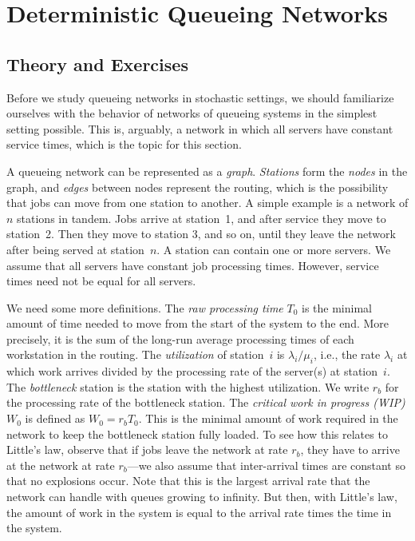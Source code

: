 
\section{Deterministic Queueing Networks}
\label{sec:determ-queu-netw}

\subsection*{Theory and Exercises}


Before we study queueing networks in stochastic settings, we should
familiarize ourselves with the behavior of networks of queueing
systems in the simplest setting possible. This is, arguably, a network in which all servers have constant service times, which is the topic for this section.


A queueing network can be represented as a
\emph{graph}. \emph{Stations} form the \emph{nodes} in the graph, and
\emph{edges} between nodes represent the routing, which is the
possibility that jobs can move from one station to another. A simple
example is a network of $n$ stations in tandem. Jobs arrive at
station~1, and after service they move to station~2. Then they move to
station 3, and so on, until they leave the network after being served at
station~$n$. A station can contain one or more servers. We assume that all servers have constant job processing times. However, service times need not be equal for all servers. 

We need some more definitions. The \emph{raw processing time} $T_0$ is the minimal amount
of time needed to move from the start of the system to the end. More precisely, it is the sum of the long-run average processing times of each workstation in the routing. The \emph{utilization} of station~$i$ is $\lambda_i/\mu_i$, i.e., the rate $\lambda_i$ at which work arrives divided by the processing rate of the server(s) at station~$i$. The \emph{bottleneck} station is the
station with the highest utilization. We write $r_b$ for the processing rate of the bottleneck station. The \emph{critical work in progress (WIP)} $W_0$ is defined as $W_0=r_b T_0$. This is the minimal amount of work required in the network to keep the bottleneck station fully loaded. To see how this relates to Little's law, observe that if jobs leave the network at rate $r_b$, they have to arrive at the network at rate $r_b$---we also assume that inter-arrival times are constant so that no explosions occur. Note that this is the largest arrival rate that the network can handle with queues growing to infinity. But then, with Little's law, the amount of work in the system is equal to the arrival rate times the time in the system.

